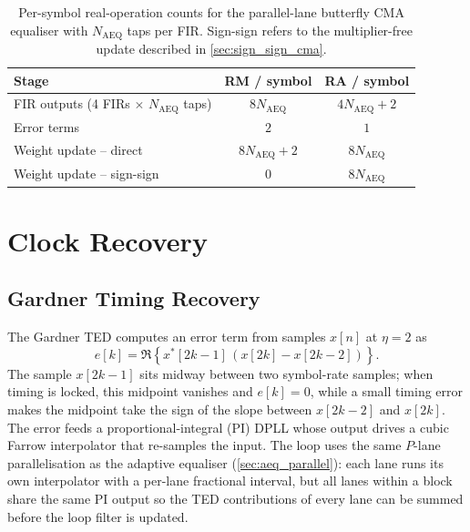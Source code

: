 \documentclass[12pt,a4paper]{report}
\begin{document}
\begin{table}[H]
    \centering
    \begin{tabular}{lcc}
        \toprule
        Stage & RM / symbol & RA / symbol \\
        \midrule
        FIR outputs (4 FIRs $\times$ $N_\mathrm{AEQ}$ taps)          & $8N_\mathrm{AEQ}$        & $4N_\mathrm{AEQ} + 2$ \\
        Error terms                                     & $2$         & $1$ \\
        Weight update -- direct                         & $8N_\mathrm{AEQ} + 2$    & $8N_\mathrm{AEQ}$ \\
        Weight update -- sign-sign                      & $0$         & $8N_\mathrm{AEQ}$ \\
        \bottomrule
    \end{tabular}
    \caption{Per-symbol real-operation counts for the parallel-lane butterfly CMA equaliser with $N_\mathrm{AEQ}$ taps per FIR. Sign-sign refers to the multiplier-free update described in \cref{sec:sign_sign_cma}.}
    \label{tab:aeq_cost}
\end{table}

\section{Clock Recovery}
\subsection{Gardner Timing Recovery}
The Gardner TED computes an error term from samples $x[n]$ at $\eta = 2$ as \cite{Zhou;10}
\begin{equation}
    e[k] = \Re\!\left\{x^*[2k-1]\,(x[2k] - x[2k-2])\right\}.
    \label{eq:gardner_ted}
\end{equation}
The sample $x[2k-1]$ sits midway between two symbol-rate samples; when timing is locked, this midpoint vanishes and $e[k]=0$, while a small timing error makes the midpoint take the sign of the slope between $x[2k-2]$ and $x[2k]$. The error feeds a proportional-integral (PI) DPLL whose output drives a cubic Farrow interpolator \cite{Farrow;88} that re-samples the input. The loop uses the same $P$-lane parallelisation as the adaptive equaliser (\cref{sec:aeq_parallel}): each lane runs its own interpolator with a per-lane fractional interval, but all lanes within a block share the same PI output so the TED contributions of every lane can be summed before the loop filter is updated.
\end{document}
